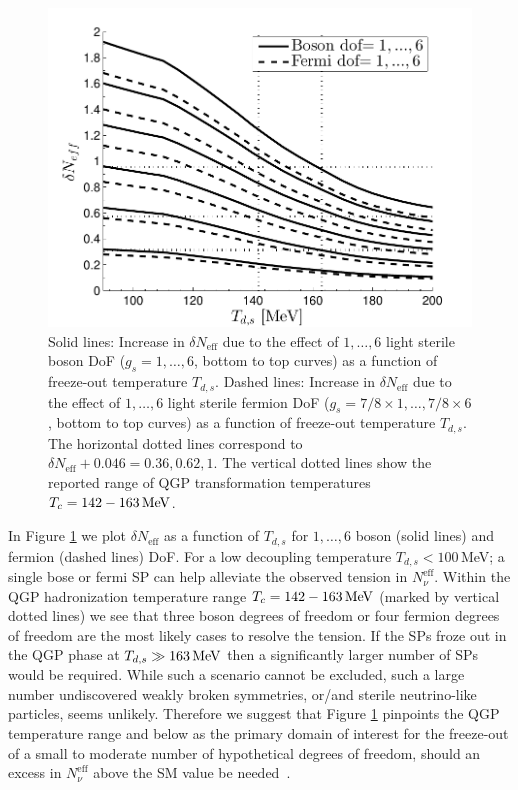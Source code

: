 \begin{figure}
\centerline{\includegraphics[width=0.75\linewidth]{plots/Neff_Td_combined.pdf}}
\caption{Solid lines: Increase in $\delta N_{\text{eff}}$ due to the effect of $1,\dots,6$ light sterile boson DoF ($g_s=1,\dots,6$, bottom to top curves) as a function of freeze-out temperature $T_{d,s}$. Dashed lines: Increase in $\delta N_{\text{eff}}$ due to the effect of $1,\dots,6$ light sterile fermion DoF ($g_s=7/8\times 1,\dots,7/8\times 6$, bottom to top curves) as a function of freeze-out temperature $T_{d,s}$. The horizontal dotted lines correspond to $\delta N_{\text{eff}}+0.046=0.36,0.62,1$. The vertical dotted lines show the reported range of QGP transformation temperatures $T_c=142-163\text{\,MeV}$. \label{fig:NeffTdZoom}}
\end{figure}

In Figure \ref{fig:NeffTdZoom} we plot $\delta N_{\text{eff}}$ as a function of $T_{d,s}$ for $1,\dots,6$ boson (solid lines) and fermion (dashed lines) DoF. For a low decoupling temperature $T_{d,s}<100$\,MeV; a single bose or fermi SP can help alleviate the observed tension in $N^{\text{eff}}_{\nu}$. Within the QGP hadronization temperature range $T_c=142-163\text{\,MeV}$ (marked by vertical dotted lines) we see that three boson degrees of freedom or four fermion degrees of freedom are the most likely cases to resolve the tension. If the SPs froze out in the QGP phase at $T_{d,s}\gg 163\text{\,MeV}$ then a significantly larger number of SPs would be required. While such a scenario cannot be excluded, such a large number undiscovered weakly broken symmetries, or/and sterile neutrino-like particles, seems unlikely. Therefore we suggest that Figure \ref{fig:NeffTdZoom} pinpoints the QGP temperature range and below as the primary domain of interest for the freeze-out of a small to moderate number of hypothetical degrees of freedom, should an excess in $N_\nu^{\text{eff}}$ above the SM value be needed~\cite{Birrell:2014cja}.
